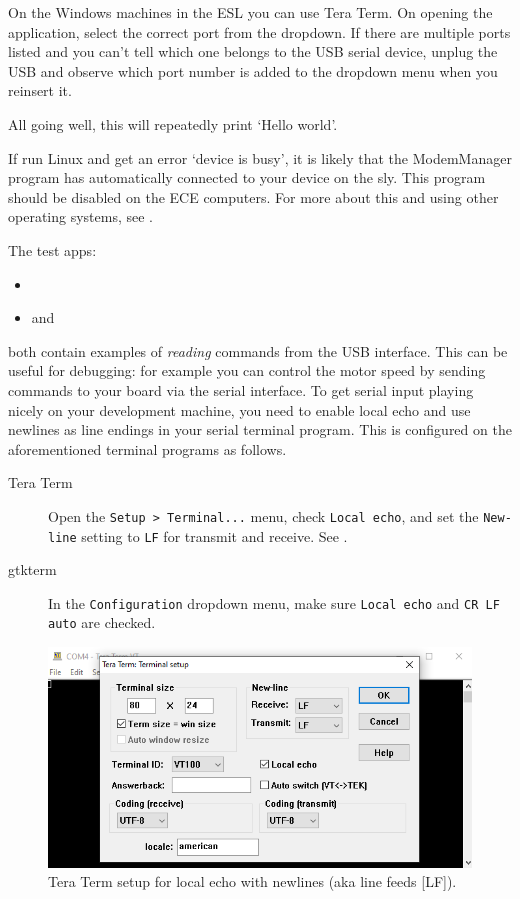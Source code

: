 On the Windows machines in the ESL you can use Tera Term. On opening the
application, select the correct  port from the 
dropdown. If there are multiple  ports listed and you can't
tell which one belongs to the USB serial device, unplug the USB and
observe which  port number is added to the dropdown menu when
you reinsert it.

All going well, this will repeatedly print `Hello world'.

If run Linux and get an error `device is busy', it is likely that the
ModemManager program has automatically connected to your device on the
sly. This program should be disabled on the ECE computers. For more
about this and using other operating systems, see .

The test apps:
\begin{itemize}
   \item {}
   \item and 
 \end{itemize}
both contain examples of \emph{reading} commands from the USB
interface. This can be useful for debugging: for example you can
control the motor speed by sending commands to your board via the
serial interface. To get serial input playing nicely on your
development machine, you need to enable local echo and use newlines as
line endings in your serial terminal program. This is configured on
the aforementioned terminal programs as follows.
\begin{description}
  \item[Tera Term] Open the \verb|Setup > Terminal...|
  menu, check \verb|Local echo|, and set the \verb|New-line| setting
  to \verb|LF| for transmit and receive. See .

  \item[gtkterm] In the \verb|Configuration| dropdown menu, make sure
  \verb|Local echo| and \verb|CR LF auto| are checked.
\end{description}

\begin{figure}[h]
  \centering
  \includegraphics{figs/tera-term-setup.png}
  \caption{Tera Term setup for local echo with newlines (aka line
  feeds [LF]).}
  \label{fig:tera-term-setup}
\end{figure}

